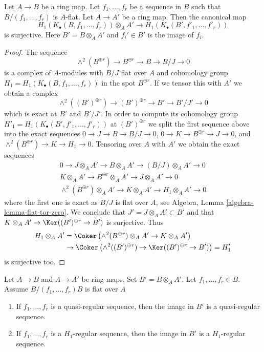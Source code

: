 \begin{lemma}
\label{lemma-base-change-H1-regular}
Let $A \to B$ be a ring map.
Let $f_1, \ldots, f_r$ be a sequence in $B$ such that $B/(f_1, \ldots, f_r)$
is $A$-flat. Let $A \to A'$ be a ring map. Then the canonical map
$$
H_1(K_\bullet(B, f_1, \ldots, f_r)) \otimes_A A'
\longrightarrow
H_1(K_\bullet(B', f'_1, \ldots, f'_r))
$$
is surjective. Here $B' = B \otimes_A A'$ and $f_i' \in B'$ is the image
of $f_i$.
\end{lemma}

\begin{proof}
The sequence
$$
\wedge^2(B^{\oplus r}) \to B^{\oplus r} \to B \to B/J \to 0
$$
is a complex of $A$-modules with $B/J$ flat over $A$ and
cohomology group $H_1 = H_1(K_\bullet(B, f_1, \ldots, f_r))$ in the spot
$B^{\oplus r}$. If we tensor this with $A'$ we obtain a complex
$$
\wedge^2((B')^{\oplus r}) \to (B')^{\oplus r} \to B' \to B'/J' \to 0
$$
which is exact at $B'$ and $B'/J'$. In order to compute its
cohomology group $H'_1 = H_1(K_\bullet(B', f'_1, \ldots, f'_r))$
at $(B')^{\oplus r}$ we split the first sequence above into
the exact sequences $0 \to J \to B \to B/J \to 0$,
$0 \to K \to B^{\oplus r} \to J \to 0$, and
$\wedge^2(B^{\oplus r}) \to K \to H_1 \to 0$.
Tensoring over $A$ with $A'$ we obtain the exact sequences
$$
\begin{matrix}
0 \to J \otimes_A A' \to B \otimes_A A' \to (B/J) \otimes_A A' \to 0 \\
K \otimes_A A' \to B^{\oplus r} \otimes_A A' \to J \otimes_A A' \to 0 \\
\wedge^2(B^{\oplus r}) \otimes_A A' \to K \otimes_A A' \to H_1 \otimes_A A'
\to 0
\end{matrix}
$$
where the first one is exact as $B/J$ is flat over $A$, see
Algebra, Lemma \ref{algebra-lemma-flat-tor-zero}. We conclude
that $J' = J \otimes_A A' \subset B'$ and that
$K \otimes_A A' \to \Ker((B')^{\oplus r} \to B')$ is
surjective. Thus
\begin{align*}
H_1 \otimes_A A'
& =
\Coker\left(\wedge^2(B^{\oplus r}) \otimes_A A' \to K \otimes_A A'\right) \\
& \to
\Coker\left(
\wedge^2((B')^{\oplus r})  \to \Ker((B')^{\oplus r} \to B')
\right) = H'_1
\end{align*}
is surjective too.
\end{proof}

\begin{lemma}
\label{lemma-relative-regular-immersion-algebra}
Let $A \to B$ and $A \to A'$ be ring maps. Set $B' = B \otimes_A A'$.
Let $f_1, \ldots, f_r \in B$. Assume $B/(f_1, \ldots, f_r)B$ is flat over $A$
\begin{enumerate}
\item If $f_1, \ldots, f_r$ is a quasi-regular sequence, then
the image in $B'$ is a quasi-regular sequence.
\item If $f_1, \ldots, f_r$ is a $H_1$-regular sequence, then
the image in $B'$ is a $H_1$-regular sequence.
\end{enumerate}
\end{lemma}

